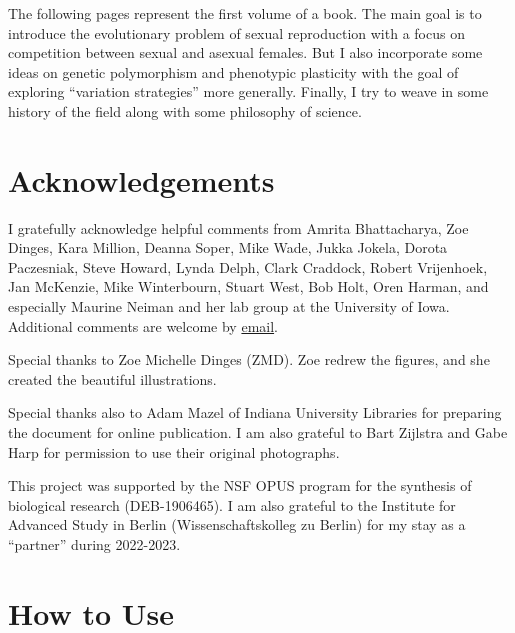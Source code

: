 \documentclass[
  letterpaper,
]{book}
\begin{document}
The following pages represent the first volume of a book. The main goal
is to introduce the evolutionary problem of sexual reproduction with a
focus on competition between sexual and asexual females. But I also
incorporate some ideas on genetic polymorphism and phenotypic plasticity
with the goal of exploring ``variation strategies'' more generally.
Finally, I try to weave in some history of the field along with some
philosophy of science.

\section*{Acknowledgements}\label{acknowledgements}


I gratefully acknowledge helpful comments from Amrita Bhattacharya, Zoe
Dinges, Kara Million, Deanna Soper, Mike Wade, Jukka Jokela, Dorota
Paczesniak, Steve Howard, Lynda Delph, Clark Craddock, Robert
Vrijenhoek, Jan McKenzie, Mike Winterbourn, Stuart West, Bob Holt, Oren
Harman, and especially Maurine Neiman and her lab group at the
University of Iowa. Additional comments are welcome by
\href{mailto:clively@indiana.edu}{email}.

Special thanks to Zoe Michelle Dinges (ZMD). Zoe redrew the figures, and
she created the beautiful illustrations.

Special thanks also to Adam Mazel of Indiana University Libraries for
preparing the document for online publication. I am also grateful to
Bart Zijlstra and Gabe Harp for permission to use their original
photographs.

This project was supported by the NSF OPUS program for the synthesis of
biological research (DEB-1906465). I am also grateful to the Institute
for Advanced Study in Berlin (Wissenschaftskolleg zu Berlin) for my stay
as a ``partner'' during 2022-2023.

\section*{How to Use}\label{how-to-use}

\end{document}
